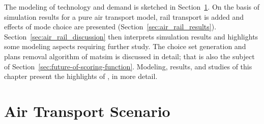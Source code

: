 The modeling of technology and demand is sketched in Section~\ref{sec:air_rail_scenario}. 
On the basis of simulation results for a pure air transport model, rail transport is added and effects of mode choice are presented (Section~\ref{sec:air_rail_results}). 
Section~\ref{sec:air_rail_discussion} then interprets simulation results and highlights some modeling aspects requiring further study. 
The choice set generation and plans removal algorithm of \gls{matsim} is discussed in detail; that is also the subject of Section~\ref{sec:future-of-scoring-function}. 
Modeling, results, and studies of this chapter present the highlights of \citet[][Chapter~6, pp.~119]{Grether2014PhD}, in more detail.   

\section{Air Transport Scenario}
\label{sec:air_rail_scenario}
